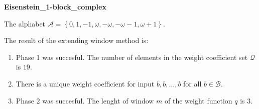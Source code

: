 \begin{exmp}
\textbf{ Eisenstein\_1-block\_complex }

\label{ex:Eisenstein1-blockcomplex}

The alphabet $\mathcal{A} =\left\{0, 1, -1, \omega, -\omega, -\omega - 1, \omega + 1\right\}$.

The result of the extending window method is:
\begin{enumerate}
    \item Phase 1 was succesful.
The number of elements in the weight coefficient set $\mathcal{Q}$ is $19$.

    \item There is a unique weight coefficient for input $b,b,\dots,b$ for all $b\in\mathcal{B}$.

    \item Phase 2 was succesful.
The lenght of window $m$ of the weight function $q$ is 3.
\end{enumerate}
\end{exmp}
